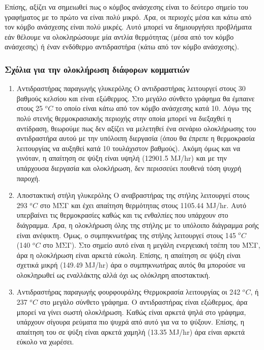 \documentclass[11pt]{article}
\begin{document}
Επίσης, αξίζει να σημειωθεί πως ο κόμβος ανάσχεσης είναι το δεύτερο σημείο του γραφήματος με το πρώτο να είναι πολύ μικρό. Άρα, οι περιοχές μέσα και κάτω από τον κόμβο ανάσχεσης είναι πολύ μικρές. Αυτό μπορεί να δημιουργήσει προβλήματα εάν θέλουμε να ολοκληρώσουμε μία αντλία θερμότητας (μέσα από τον κόμβο ανάσχεσης) ή έναν ενδόθερμο αντιδραστήρα (κάτω από τον κόμβο ανάσχεσης).

\subsubsection{Σχόλια για την ολοκλήρωση διάφορων κομματιών}
\label{sec:orgde86f14}
\begin{enumerate}
\item Αντιδραστήρας παραγωγής γλυκερόλης
\label{sec:org9afad85}
Ο αντιδραστήρας λειτουργεί στους 30 βαθμούς κελσίου και είναι εξώθερμος. Στο μεγάλο σύνθετο γράφημα θα έμπαινε στους 25 \(^oC\) το οποίο είναι κάτω από τον κόμβο ανάσχεσης κατά 10. Λόγω της πολύ στενής θερμοκρασιακής περιοχής στην οποία μπορεί να διεξαχθεί η αντίδραση, θεωρούμε πως δεν αξίζει να μελετηθεί ένα σενάριο ολοκλήρωσης του αντιδραστήρα αυτού με την υπόλοιπη διεργασία (όπου θα έπρεπε η θερμοκρασία λειτουργίας να αυξηθεί κατά 10 τουλάχιστον βαθμούς). Ακόμη όμως και να γινόταν, η απαίτηση σε ψύξη είναι υψηλή (12901.5 MJ/hr) και με την υπάρχουσα διεργασία και ολοκλήρωση, δεν περισσεύει πουθενά τόση ψυχρή παροχή.
\item Αποστακτική στήλη γλυκερόλης
\label{sec:org343eea8}
Ο αναβραστήρας της στήλης λειτουργεί στους 293 \(^oC\) στο ΜΣΓ και έχει απαίτηση θερμότητας στους 1105.44 MJ/hr. Αυτό υπερβαίνει τις θερμοκρασίες καθώς και τις ενθαλπίες που υπάρχουν στο διάγραμμα. Άρα, η ολοκλήρωση όλης της στήλης με το υπόλοιπο διάγραμμα ροής είναι ανέφικτη. Όμως, ο συμπηκνωτήρας της στήλης λειτουργεί στους 145 \(^oC\) (140 \(^oC\) στο ΜΣΓ). Στο σημείο αυτό είναι η μεγάλη ενεργειακή τσέπη του ΜΣΓ, άρα η ολοκλήρωση είναι αρκετά εύκολη. Επίσης, η απαίτηση σε ψύξη είναι σχετικά μικρή (149.49 MJ/hr) άρα ο συμπηκνωτήρας αυτός θα μπορούσε να ολοκληρωθεί ως εναλλάκτης αλλά όχι ως ολόκληρη αποστακτική.
\item Αντιδραστήρας παραγωγής φουρφουράλης
\label{sec:org7a6a7b9}
Θερμοκρασία λειτουργίας οι 242 \(^oC\), ή 237 \(^oC\) στο μεγάλο σύνθετο γράφημα. Ο αντιδραστήρας είναι εξώθερμος, άρα μπορεί να γίνει σωστή ολοκλήρωση. Καθώς είναι αρκετά ψηλά στο γράφημα, υπάρχουν σίγουρα ρεύματα πιο ψυχρά από αυτό για να το ψύξουν. Επίσης, η απαίτηση του σε ψύξη είναι αρκετά χαμηλή (13.35 MJ/hr) άρα είναι αρκετά εύκολο να χωρέσει.

\end{enumerate}
\end{document}
